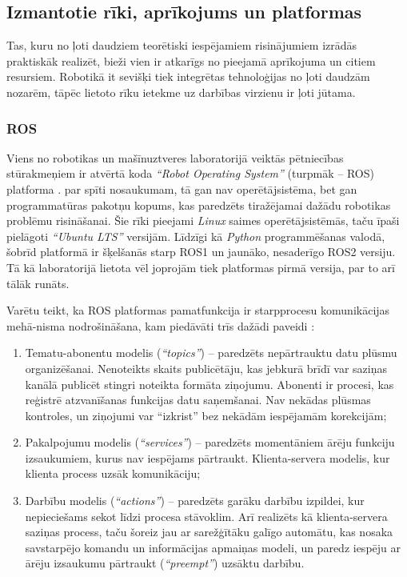 \documentclass[12pt, a4paper]{article}
\numberwithin{equation}{section} %
\begin{document}
\subsection{Izmantotie rīki, aprīkojums un platformas}

Tas, kuru no ļoti daudziem teorētiski iespējamiem risinājumiem izrādās praktiskāk realizēt, bieži vien ir atkarīgs no pieejamā aprīkojuma un citiem resursiem. Robotikā it sevišķi tiek integrētas tehnoloģijas no ļoti daudzām nozarēm, tāpēc lietoto rīku ietekme uz darbības virzienu ir ļoti jūtama.

\subsubsection{ROS}

Viens no robotikas un mašīnuztveres laboratorijā veiktās pētniecības stūrakmeņiem ir atvērtā koda \textit{``Robot Operating System''} (turpmāk -- ROS) platforma \cite{ros_org}. par spīti nosaukumam, tā gan nav operētājsistēma, bet gan programmatūras pakotņu kopums, kas paredzēts tiražējamai dažādu robotikas problēmu risināšanai. Šie rīki pieejami \textit{Linux} saimes operētājsistēmās, taču īpaši pielāgoti \textit{``Ubuntu LTS''} versijām. Līdzīgi kā \textit{Python} programmēšanas valodā, šobrīd platformā ir šķelšanās starp ROS1 un jaunāko, nesaderīgo ROS2 versiju. Tā kā laboratorijā lietota vēl joprojām tiek platformas pirmā versija, par to arī tālāk runāts.

Varētu teikt, ka ROS platformas pamatfunkcija ir starpprocesu komunikācijas mehā-nisma nodrošināšana, kam piedāvāti trīs dažādi paveidi \cite{ros_comm_patterns}:

\begin{enumerate}
    \item Tematu-abonentu modelis (\textit{``topics''}) -- paredzēts nepārtrauktu datu plūsmu organizēšanai. Nenoteikts skaits publicētāju, kas jebkurā brīdī var saziņas kanālā publicēt stingri noteikta formāta ziņojumu. Abonenti ir procesi, kas reģistrē atzvanīšanas funkcijas datu saņemšanai. Nav nekādas plūsmas kontroles, un ziņojumi var ``izkrist'' bez nekādām iespējamām korekcijām;
    \item Pakalpojumu modelis (\textit{``services''}) -- paredzēts momentāniem ārēju funkciju izsaukumiem, kurus nav iespējams pārtraukt. Klienta-servera modelis, kur klienta process uzsāk komunikāciju;
    \item Darbību modelis (\textit{``actions''}) -- paredzēts garāku darbību izpildei, kur nepieciešams sekot līdzi procesa stāvoklim. Arī realizēts kā klienta-servera saziņas process, taču šoreiz jau ar sarežģītāku galīgo automātu, kas nosaka savstarpējo komandu un informācijas apmaiņas modeli, un paredz iespēju ar ārēju izsaukumu pārtraukt (\textit{``preempt''}) uzsāktu darbību.
\end{enumerate}
\end{document}
